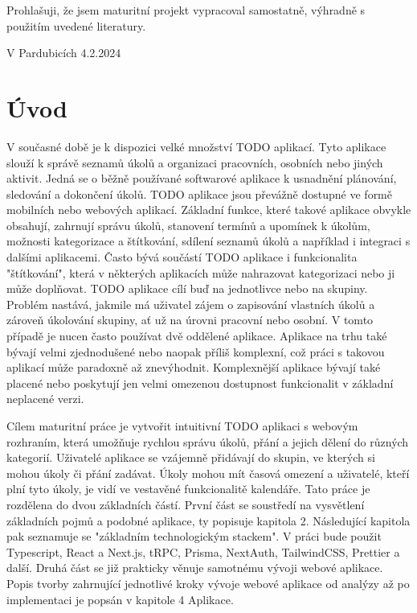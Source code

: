 \documentclass[a4paper,12pt]{report}
\begin{document}

\pagebreak
\vspace*{\fill}
Prohlašuji, že jsem maturitní projekt vypracoval samostatně, výhradně s použitím uvedené literatury.

V Pardubicích 4.2.2024

\pagebreak
\renewcommand{\contentsname}{\centering Obsah}
\tableofcontents
\pagebreak

\setcounter{page}{1}
\setcounter{section}{1}
\chapter{Úvod}
V současné době je k dispozici velké množství TODO aplikací. Tyto aplikace slouží k správě seznamů úkolů a organizaci pracovních, osobních nebo jiných aktivit. Jedná se o běžně používané softwarové aplikace k usnadnění plánování, sledování a dokončení úkolů. TODO aplikace jsou převážně dostupné ve formě mobilních nebo webových aplikací.
\newline
Základní funkce, které takové aplikace obvykle obsahují, zahrnují správu úkolů, stanovení termínů a upomínek k úkolům, možnosti kategorizace a štítkování, sdílení seznamů úkolů a například i integraci s dalšími aplikacemi. Často bývá součástí TODO aplikace i funkcionalita "štítkování", která v některých aplikacích může nahrazovat kategorizaci nebo ji může doplňovat.
\newline
TODO aplikace cílí buď na jednotlivce nebo na skupiny. Problém nastává, jakmile má uživatel zájem o zapisování  vlastních úkolů a zároveň úkolování skupiny, ať už na úrovni pracovní nebo osobní. V tomto případě je nucen často používat dvě oddělené aplikace. Aplikace na trhu také bývají velmi zjednodušené nebo naopak příliš komplexní, což práci s takovou aplikací může paradoxně až znevýhodnit. Komplexnější aplikace bývají také placené nebo poskytují jen velmi omezenou dostupnost funkcionalit v základní neplacené verzi.
\newline

Cílem maturitní práce je vytvořit intuitivní TODO aplikaci s webovým rozhraním, která umožňuje rychlou správu úkolů, přání a jejich dělení do různých kategorií. Uživatelé aplikace se vzájemně přidávají do skupin, ve kterých si mohou úkoly či přání zadávat. Úkoly mohou mít časová omezení a uživatelé, kteří plní tyto úkoly, je vidí ve vestavěné funkcionalitě kalendáře.
\newline
Tato práce je rozdělena do dvou základních částí. První část se soustředí na vysvětlení základních pojmů a podobné aplikace, ty popisuje kapitola 2. Následující kapitola pak seznamuje se "základním technologickým stackem". V práci bude použit Typescript, React a Next.js, tRPC, Prisma, NextAuth, TailwindCSS, Prettier a další.
\newline
Druhá část se již prakticky věnuje samotnému vývoji webové aplikace. Popis tvorby zahrnující jednotlivé kroky vývoje webové aplikace od analýzy až po implementaci je popsán v kapitole 4 Aplikace.
\newline



\end{document}
